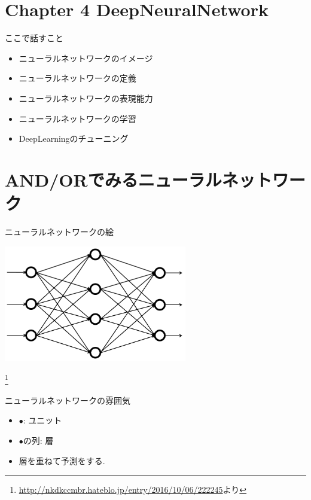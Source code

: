\section{Chapter 4 DeepNeuralNetwork}


\begin{frame}[fragile]{ここで話すこと}
\begin{itemize}
\item  ニューラルネットワークのイメージ \\
\item ニューラルネットワークの定義 \\
\item ニューラルネットワークの表現能力 \\
\item ニューラルネットワークの学習 \\
\item DeepLearningのチューニング
\end{itemize}
\end{frame}

\section{AND/ORでみるニューラルネットワーク}

\begin{frame}{ニューラルネットワークの絵}
\begin{center}
\includegraphics[width=8cm]{pic/dnn_sample.png}
\end{center}

\footnote{\url{http://nkdkccmbr.hateblo.jp/entry/2016/10/06/222245}より}
\end{frame}

\begin{frame}[fragile]{ニューラルネットワークの雰囲気}
  \begin{itemize}
    \item $\bullet$: ユニット
    \item $\bullet$の列: 層
    \item 層を重ねて予測をする.
  \end{itemize}
\end{frame}

